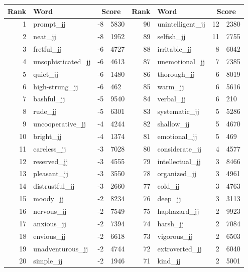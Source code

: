 \begin{table}[tbp]
    \begin{tabular}{| rlr@{.}l | rlr@{.}l |}
    \hline
    \textbf{Rank} & \textbf{Word} & \multicolumn{2}{c|}{\textbf{Score}} & \textbf{Rank} & \textbf{Word} & \multicolumn{2}{c|}{\textbf{Score}} \\
    \hline
    1 & prompt\_jj & -8 & 5830    &    90 & unintelligent\_jj & 12 & 2380 \\
    2 & neat\_jj & -8 & 1952    &    89 & selfish\_jj & 11 & 7755 \\
    3 & fretful\_jj & -6 & 4727    &    88 & irritable\_jj & 8 & 6042 \\
    4 & unsophisticated\_jj & -6 & 4613    &    87 & unemotional\_jj & 7 & 7385 \\
    5 & quiet\_jj & -6 & 1480    &    86 & thorough\_jj & 6 & 8019 \\
    6 & high-strung\_jj & -6 & 462    &    85 & warm\_jj & 6 & 5616 \\
    7 & bashful\_jj & -5 & 9540    &    84 & verbal\_jj & 6 & 210 \\
    8 & rude\_jj & -5 & 6301    &    83 & systematic\_jj & 5 & 5286 \\
    9 & uncooperative\_jj & -4 & 4244    &    82 & shallow\_jj & 5 & 4670 \\
    10 & bright\_jj & -4 & 1374    &    81 & emotional\_jj & 5 & 469 \\
    11 & careless\_jj & -3 & 7028    &    80 & considerate\_jj & 4 & 4577 \\
    12 & reserved\_jj & -3 & 4555    &    79 & intellectual\_jj & 3 & 8466 \\
    13 & pleasant\_jj & -3 & 3550    &    78 & organized\_jj & 3 & 4961 \\
    14 & distrustful\_jj & -3 & 2660    &    77 & cold\_jj & 3 & 4763 \\
    15 & moody\_jj & -2 & 8234    &    76 & deep\_jj & 3 & 3113 \\
    16 & nervous\_jj & -2 & 7549    &    75 & haphazard\_jj & 2 & 9923 \\
    17 & anxious\_jj & -2 & 7394    &    74 & harsh\_jj & 2 & 7084 \\
    18 & envious\_jj & -2 & 6618    &    73 & vigorous\_jj & 2 & 6503 \\
    19 & unadventurous\_jj & -2 & 4744    &    72 & extroverted\_jj & 2 & 6040 \\
    20 & simple\_jj & -2 & 1946    &    71 & kind\_jj & 2 & 5001 \\

\end{tabular}
\end{table}
